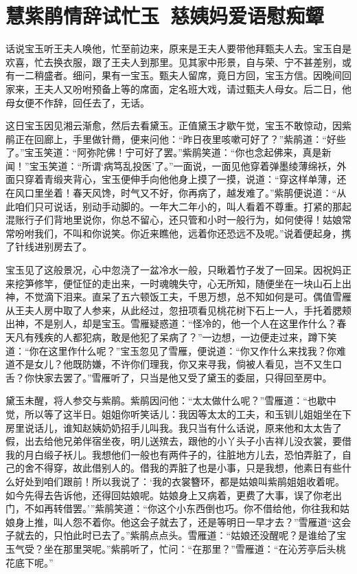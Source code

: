 \documentclass[12pt,oneside]{book}
\begin{document}
 
\chapter{慧紫鹃情辞试忙玉~慈姨妈爱语慰痴颦}
话说宝玉听王夫人唤他，忙至前边来，原来是王夫人要带他拜甄夫人去。宝玉自是欢喜，忙去换衣服，跟了王夫人到那里。见其家中形景，自与荣、宁不甚差别，或有一二稍盛者。细问，果有一宝玉。甄夫人留席，竟日方回，宝玉方信。因晚间回家来，王夫人又吩咐预备上等的席面，定名班大戏，请过甄夫人母女。后二日，他母女便不作辞，回任去了，无话。

这日宝玉因见湘云渐愈，然后去看黛玉。正值黛玉才歇午觉，宝玉不敢惊动，因紫鹃正在回廊上，手里做针黹，便来问他：“昨日夜里咳嗽可好了？”紫鹃道：“好些了。”宝玉笑道：“阿弥陀佛！宁可好了罢。”紫鹃笑道：“你也念起佛来，真是新闻！”宝玉笑道：“所谓‘病笃乱投医’了。”一面说，一面见他穿着弹墨绫薄绵袄，外面只穿着青缎夹背心，宝玉便伸手向他他身上摸了一摸，说道：“穿这样单薄，还在风口里坐着！春天风馋，时气又不好，你再病了，越发难了。”紫鹃便说道：“从此咱们只可说话，别动手动脚的。一年大二年小的，叫人看着不尊重。打紧的那起混账行子们背地里说你，你总不留心，还只管和小时一般行为，如何使得！姑娘常常吩咐我们，不叫和你说笑。你近来瞧他，远着你还恐远不及呢。”说着便起身，携了针线进别房去了。

宝玉见了这般景况，心中忽浇了一盆冷水一般，只瞅着竹子发了一回呆。因祝妈正来挖笋修竿，便怔怔的走出来，一时魂魄失守，心无所知，随便坐在一块山石上出神，不觉滴下泪来。直呆了五六顿饭工夫，千思万想，总不知如何是可。偶值雪雁从王夫人房中取了人参来，从此经过，忽扭项看见桃花树下石上一人，手托着腮颊出神，不是别人，却是宝玉。雪雁疑惑道：“怪冷的，他一个人在这里作什么？春天凡有残疾的人都犯病，敢是他犯了呆病了？”一边想，一边便走过来，蹲下笑道：“你在这里作什么呢？”宝玉忽见了雪雁，便说道：“你又作什么来找我？你难道不是女儿？他既防嫌，不许你们理我，你又来寻我，倘被人看见，岂不又生口舌？你快家去罢了。”雪雁听了，只当是他又受了黛玉的委屈，只得回至房中。

黛玉未醒，将人参交与紫鹃。紫鹃因问他：“太太做什么呢？”雪雁道：“也歇中觉，所以等了这半日。姐姐你听笑话儿：我因等太太的工夫，和玉钏儿姐姐坐在下房里说话儿，谁知赵姨奶奶招手儿叫我。我只当有什么话说，原来他和太太告了假，出去给他兄弟伴宿坐夜，明儿送殡去，跟他的小丫头子小吉祥儿没衣裳，要借我的月白缎子袄儿。我想他们一般也有两件子的，往脏地方儿去，恐怕弄脏了，自己的舍不得穿，故此借别人的。借我的弄脏了也是小事，只是我想，他素日有些什么好处到咱们跟前！所以我说了：‘我的衣裳簪环，都是姑娘叫紫鹃姐姐收着呢。如今先得去告诉他，还得回姑娘呢。姑娘身上又病着，更费了大事，误了你老出门，不如再转借罢。’”紫鹃笑道：“你这个小东西倒也巧。你不借给他，你往我和姑娘身上推，叫人怨不着你。他这会子就去了，还是等明日一早才去？”雪雁道“这会子就去的，只怕此时已去了。”紫鹃点点头。雪雁道：“姑娘还没醒呢？是谁给了宝玉气受？坐在那里哭呢。”紫鹃听了，忙问：“在那里？”雪雁道：“在沁芳亭后头桃花底下呢。”
\end{document}
